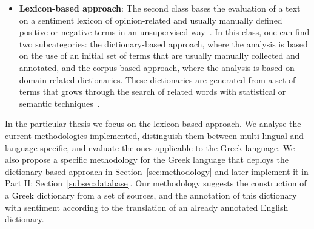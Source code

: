 \begin{itemize}
 \item \textbf{Lexicon-based approach}:
 The second class bases the evaluation of a text on a sentiment lexicon
 of opinion-related and usually manually defined positive or negative terms
 in an unsupervised way~\cite{SORH15,GSZ13,Tur02}.
 In this class, one can find two subcategories:
 the dictionary-based approach,
 where the analysis is based on the use of an initial set of terms
 that are usually manually collected and annotated,
 and the corpus-based approach, where the analysis is based
 on domain-related dictionaries.
 These dictionaries are generated from a set of terms
 that grows through the search of related words
 with statistical or semantic techniques~\cite{SORH15}.
 
\end{itemize}

In the particular thesis we focus on the lexicon-based approach.
We analyse the current methodologies implemented,
distinguish them between multi-lingual and language-specific,
and evaluate the ones applicable to the Greek language.
We also propose a specific methodology for the Greek language
that deploys the dictionary-based approach in Section~\ref{sec:methodology}
and later implement it in Part II: Section~\ref{subsec:database}.
Our methodology suggests the construction of a Greek dictionary
from a set of sources,
and the annotation of this dictionary with sentiment
according to the translation of an already annotated English dictionary.
